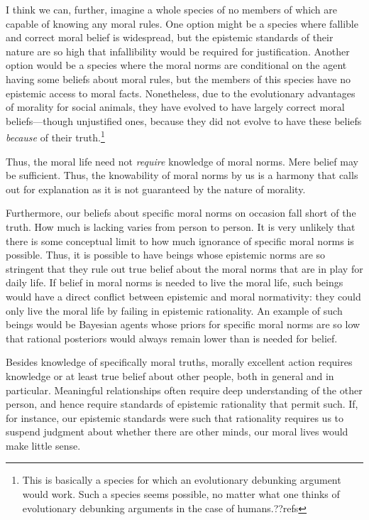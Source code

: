 I think we can, further, imagine a whole species of no members of which are capable of knowing any moral rules. 
One option might be a species where fallible and correct moral belief is widespread, but the epistemic standards of 
their nature are so high that infallibility would be required for justification. Another option would be a species 
where the moral norms are conditional on the agent having some beliefs about moral rules, but the members of this 
species have no epistemic access to moral facts. Nonetheless, due to the evolutionary advantages of morality for 
social animals, they have evolved to have largely correct moral beliefs---though unjustified ones, because they
did not evolve to have these beliefs \textit{because} of their truth.\footnote{This is basically a species for which
an evolutionary debunking argument would work. Such a species seems possible, no matter what one thinks of evolutionary
debunking arguments in the case of humans.??refs}

Thus, the moral life need not \textit{require} knowledge of moral norms. Mere belief may be sufficient. Thus,
the knowability of moral norms by us is a harmony that calls out for explanation as it is not guaranteed by the
nature of morality.

Furthermore, our beliefs about specific moral norms on occasion fall short of the truth.
How much is lacking varies from person to person. It is very unlikely that there is some conceptual limit to how much
ignorance of specific moral norms is possible. Thus, it is possible to have beings whose epistemic norms are so stringent
that they rule out true belief about the moral norms that are in play for daily life. If belief in moral norms is needed 
to live the moral life, such beings would have a direct conflict between epistemic and moral normativity: they could only 
live the moral life by failing in epistemic rationality. An example of such beings would be Bayesian agents whose
priors for specific moral norms are so low that rational posteriors would always remain lower than 
is needed for belief.

Besides knowledge of specifically moral truths, morally excellent action requires knowledge or at least true belief about 
other people, both in general and in particular. Meaningful relationships often require deep understanding of the other 
person, and hence require standards of epistemic rationality that permit such. If, for instance, our epistemic standards
were such that rationality requires us to suspend judgment about whether there are other minds, our moral lives would 
make little sense. 

